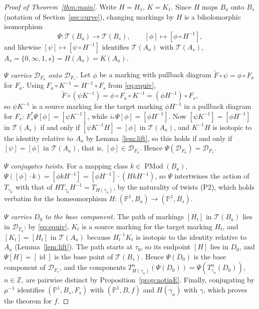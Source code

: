 \documentclass[11pt]{article}
\newcommand{\Pone}{\mathbb P^1}
\newcommand{\Z}{\mathbb Z}
\newcommand{\Teich}{\mathcal T}
\newcommand{\D}{\mathcal D}
\newcommand{\id}{\operatorname{id}}
\newcommand{\PMod}{\operatorname{PMod}}
\theoremstyle{remark}
\numberwithin{equation}{section}
\begin{document}
\begin{proof}[Proof of Theorem~\ref{thm:main}]
Write $H=H_1$, $K=K_1$. Since $H$ maps $B_a$ onto $B_s$ (notation of
Section~\ref{sec:curve}), changing markings by $H$ is a biholomorphic
isomorphism
\[
 \Psi\colon\Teich(B_a)\longrightarrow\Teich(B_s),\qquad
 [\phi]\longmapsto[\phi\circ H^{-1}],
\]
and likewise $[\psi]\mapsto[\psi\circ H^{-1}]$ identifies $\Teich(A_a)$
with $\Teich(A_s)$, $A_s=\{0,\infty,1,s\}=H(A_a)=K(A_a)$.

\emph{$\Psi$ carries $\D_{F_a}$ onto $\D_{F_s}$.} Let $\phi$ be a marking
with pullback diagram $\widetilde F\circ\psi=\phi\circ F_a$ for $F_a$.
Using $F_a\circ K^{-1}=H^{-1}\circ F_s$ from \eqref{eq:equiv},
\[
 \widetilde F\circ(\psi K^{-1})=\phi\circ F_a\circ K^{-1}
 =(\phi H^{-1})\circ F_s ,
\]
so $\psi K^{-1}$ is a source marking for the target marking $\phi H^{-1}$
in a pullback diagram for $F_s$: $F_s^*\Psi[\phi]=[\psi K^{-1}]$, while
$i_*\Psi[\phi]=[\phi H^{-1}]$. Now $[\psi K^{-1}]=[\phi H^{-1}]$ in
$\Teich(A_s)$ if and only if $[\psi K^{-1}H]=[\phi]$ in $\Teich(A_a)$, and
$K^{-1}H$ is isotopic to the identity relative to $A_a$ by
Lemma~\ref{lem:lift}, so this holds if and only if $[\psi]=[\phi]$ in
$\Teich(A_a)$, that is, $[\phi]\in\D_{F_a}$. Hence
$\Psi(\D_{F_a})=\D_{F_s}$.

\emph{$\Psi$ conjugates twists.} For a mapping class $k\in\PMod(B_a)$,
$\Psi([\phi]\cdot k)=[\phi kH^{-1}]=[\phi H^{-1}]\cdot(HkH^{-1})$, so $\Psi$
intertwines the action of $T_{\gamma_a}$ with that of
$HT_{\gamma_a}H^{-1}=T_{H(\gamma_a)}$, by the naturality of twists (P2),
which holds verbatim for the homeomorphism $H\colon(\Pone,B_a)\to(\Pone,B_s)$.

\emph{$\Psi$ carries $D_0$ to the base component.} The path of markings
$[H_t]$ in $\Teich(B_a)$ lies in $\D_{F_a}$: by \eqref{eq:equiv}, $K_t$ is
a source marking for the target marking $H_t$, and $[K_t]=[H_t]$ in
$\Teich(A_a)$ because $H_t^{-1}K_t$ is isotopic to the identity relative to
$A_a$ (Lemma~\ref{lem:lift}). The path starts at $\tau_0$, so its endpoint
$[H]$ lies in $D_0$, and $\Psi[H]=[\id]$ is the base point of
$\Teich(B_s)$. Hence $\Psi(D_0)$ is the base component of $\D_{F_s}$, and
the components $T_{H(\gamma_a)}^n(\Psi(D_0))=\Psi(T_{\gamma_a}^n(D_0))$,
$n\in\Z$, are pairwise distinct by Proposition~\ref{prop:notinE}. Finally,
conjugating by $\mu^{-1}$ identifies $(\Pone,B_s,F_s)$ with $(\Pone,B,f)$
and $H(\gamma_a)$ with $\gamma$, which proves the theorem for $f$.
\end{proof}
\end{document}
